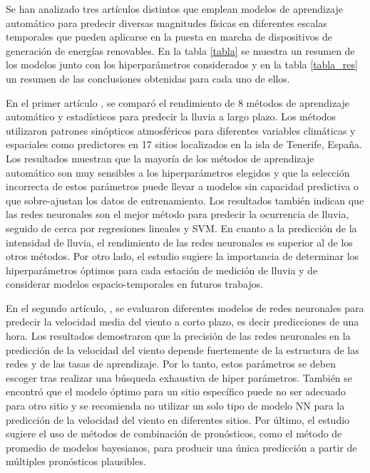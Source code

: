 \documentclass[12pt]{article}
\begin{document}
Se han analizado tres artículos distintos que emplean modelos de aprendizaje automático para predecir diversas magnitudes físicas en diferentes escalas temporales 
que pueden aplicarse en la puesta en marcha de dispositivos de generación de energías renovables. En la tabla \ref{tabla}  se muestra un resumen de los modelos junto con los hiperparámetros considerados y en la tabla \ref{tabla_res} un resumen de las conclusiones obtenidas para cada uno de ellos.

En el primer artículo \citep{Manuel}, se comparó el rendimiento de 8 métodos de aprendizaje automático y 
estadísticos para predecir la lluvia a largo plazo. Los métodos utilizaron patrones 
sinópticos atmosféricos para diferentes variables climáticas y espaciales como predictores en 
17 sitios localizados  en la isla de Tenerife, España. Los resultados
 muestran que la mayoría de los métodos de aprendizaje automático son muy sensibles 
a los hiperparámetros elegidos y que la selección incorrecta de estos parámetros
 puede llevar a modelos sin capacidad predictiva o que sobre-ajustan los
 datos de entrenamiento. Los resultados también indican que las redes neuronales son el mejor método 
para predecir la ocurrencia de lluvia, seguido de cerca por regresiones lineales y SVM. En cuanto a la predicción de la intensidad 
de lluvia, el rendimiento de las redes neuronales es superior al de los otros métodos. 
Por otro lado, el estudio sugiere la importancia de determinar los hiperparámetros 
óptimos para cada estación de medición de lluvia y de considerar modelos espacio-temporales 
en futuros trabajos.

En el segundo artículo, \citep{Li2}, se evaluaron diferentes modelos de redes neuronales  
para predecir la velocidad media del viento a corto plazo, es decir predicciones de una hora. Los resultados demostraron 
que la precisión de las redes neuronales en la predicción de la velocidad del viento depende fuertemente de
la estructura de las redes y de las tasas de aprendizaje.
Por lo tanto, estos parámetros se deben escoger tras realizar una búsqueda exhaustiva de hiper parámetros. 
También se encontró que el modelo óptimo para  un sitio específico puede no ser adecuado para otro sitio y 
se recomienda no utilizar un solo tipo de modelo NN para la predicción de la velocidad del viento en diferentes sitios. Por último, 
el estudio sugiere el uso de métodos de combinación de pronósticos, como el método de promedio de modelos 
bayesianos, para producir una única predicción a partir de múltiples pronósticos plausibles.
\end{document}
